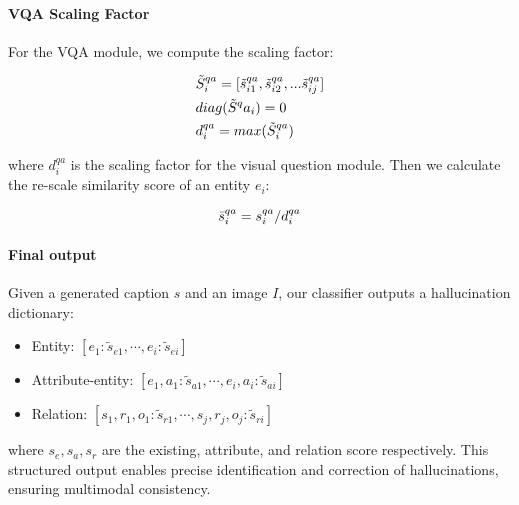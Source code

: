 \paragraph{VQA Scaling Factor}
For the VQA module, we compute the scaling factor:

\vspace{-5pt}
\begin{align}
    & \tilde{S}^{qa}_i = [\tilde{s}^{qa}_{i1}, \tilde{s}^{qa}_{i2}, ...\tilde{s}^{qa}_{ij} ] \\
    & diag(\tilde{S}^qa_i) =0 \\
    & d^{qa}_i = max(\tilde{S}^{qa}_i)
\vspace{-5pt}
\end{align}

\noindent where $d^{qa}_i$ is the scaling factor for the visual question module. Then we calculate the re-scale similarity score of an entity $e_i$:

\vspace{-5pt}
\begin{equation}   
    \bar{s}^{qa}_i = s^{qa}_i / d^{qa}_i
\vspace{-5pt}
\end{equation}

\paragraph{Final output}


Given a generated caption $s$ and an image $I$, our classifier outputs a hallucination dictionary:

\begin{itemize}
    
\item Entity: $\left [ e_1: \tilde{s}_{e1}, \cdots, e_i: \tilde{s}_{ei} \right ]$

\item Attribute-entity: $\left [ e_1,a_1: \tilde{s}_{a1}, \cdots, e_i,a_i: \tilde{s}_{ai} \right ]$


\item Relation: $\left [ s_1,r_1,o_1: \tilde{s}_{r1}, \cdots, s_j,r_j,o_j: \tilde{s}_{ri} \right ]$

\end{itemize}

\noindent where $s_e, s_a, s_r$ are the existing, attribute, and relation score respectively. This structured output enables precise identification and correction of hallucinations, ensuring multimodal consistency.

